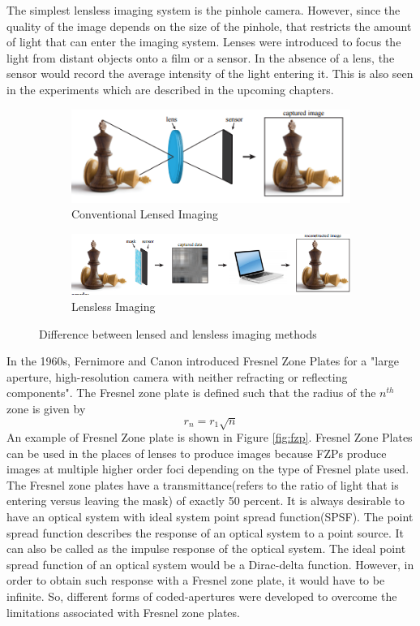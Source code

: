 The simplest lensless imaging system is the pinhole camera. However, since the quality of the image depends on the size of the pinhole, that restricts the amount of light that can enter the imaging system. Lenses were introduced to focus the light from distant objects onto a film or a sensor. In the absence of a lens, the sensor would record the average intensity of the light entering it. This is also seen in the experiments which are described in the upcoming chapters. 
\begin{figure}[ht]
\centering
\begin{subfigure}{\textwidth}
  \centering
  \includegraphics[width=0.75\linewidth]{pics/lensless_1}
  \caption{Conventional Lensed Imaging}
  \label{fig:lensed_imaging}
\end{subfigure}
\begin{subfigure}{\textwidth}
  \centering
  \includegraphics[width=0.75\linewidth]{pics/lensless_2}
  \caption{Lensless Imaging}
  \label{fig:lensless_imaging}
\end{subfigure}
\caption{Difference between lensed and lensless imaging methods\cite{VBoomi}}
\label{fig:lensvslensless}
\end{figure}

In the 1960s, Fernimore and Canon introduced Fresnel Zone Plates for a "large aperture, high-resolution camera with neither refracting or reflecting components"\cite{Cannon1}. The Fresnel zone plate is defined such that the radius of the $n^{th}$ zone is given by 
\begin{equation}
r_n  = r_1 \sqrt{n}
\end{equation}
An example of Fresnel Zone plate is shown in Figure \ref{fig:fzp}. Fresnel Zone Plates can be used in the places of lenses to produce images because FZPs produce images at multiple higher order foci depending on the type of Fresnel plate used. The Fresnel zone plates have a transmittance(refers to the ratio of light that is entering versus leaving the mask) of exactly 50 percent. It is always desirable to have an optical system with ideal system point spread function(SPSF). The point spread function describes the response of an optical system to a point source. It can also be called as the impulse response of the optical system. The ideal point spread function of an optical system would be a Dirac-delta function. However, in order to obtain such response with a Fresnel zone plate, it would have to be infinite. So, different forms of coded-apertures were developed to overcome the limitations associated with Fresnel zone plates. 

